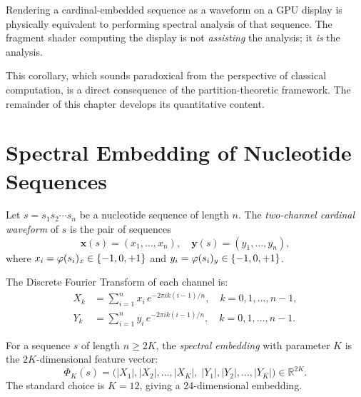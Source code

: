 \begin{corollary}
\label{cor:display_is_analysis}
Rendering a cardinal-embedded sequence as a waveform on a GPU display is
physically equivalent to performing spectral analysis of that sequence. The
fragment shader computing the display is not \emph{assisting} the analysis;
it \emph{is} the analysis.
\end{corollary}

This corollary, which sounds paradoxical from the perspective of classical
computation, is a direct consequence of the partition-theoretic framework.
The remainder of this chapter develops its quantitative content.

\section{Spectral Embedding of Nucleotide Sequences}
\label{sec:spectral_embedding}

\begin{definition}
\label{def:two_channel}
Let $s = s_1 s_2 \cdots s_n$ be a nucleotide sequence of length $n$.
The \emph{two-channel cardinal waveform} of $s$ is the pair of sequences
\begin{equation}
  \mathbf{x}(s) = (x_1, \ldots, x_n), \quad
  \mathbf{y}(s) = (y_1, \ldots, y_n),
  \label{eq:two_channel}
\end{equation}
where $x_i = \varphi(s_i)_x \in \{-1, 0, +1\}$ and
$y_i = \varphi(s_i)_y \in \{-1, 0, +1\}$.
\end{definition}

The Discrete Fourier Transform of each channel is:
\begin{align}
  X_k &= \sum_{i=1}^{n} x_i \, e^{-2\pi i k(i-1)/n}, \quad k = 0, 1, \ldots, n-1,
  \label{eq:dft_x}\\
  Y_k &= \sum_{i=1}^{n} y_i \, e^{-2\pi i k(i-1)/n}, \quad k = 0, 1, \ldots, n-1.
  \label{eq:dft_y}
\end{align}

\begin{definition}
\label{def:spectral_embedding}
For a sequence $s$ of length $n \geq 2K$, the \emph{spectral embedding} with
parameter $K$ is the $2K$-dimensional feature vector:
\begin{equation}
  \Phi_K(s) = \bigl(|X_1|, |X_2|, \ldots, |X_K|,\;
                    |Y_1|, |Y_2|, \ldots, |Y_K|\bigr) \in \mathbb{R}^{2K}.
  \label{eq:spectral_embedding}
\end{equation}
The standard choice is $K = 12$, giving a 24-dimensional embedding.
\end{definition}


